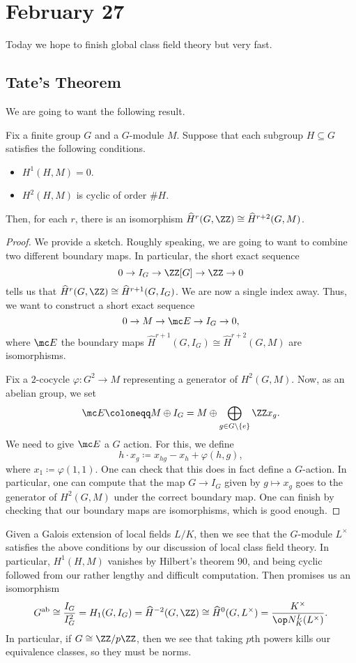 \documentclass[../notes.tex]{subfiles}
\begin{document}
\section{February 27}

Today we hope to finish global class field theory but very fast.

\subsection{Tate's Theorem}
We are going to want the following result.
\begin{theorem}[Tate] \label{thm:tate}
	Fix a finite group $G$ and a $G$-module $M$. Suppose that each subgroup $H\subseteq G$ satisfies the following conditions.
	\begin{itemize}
		\item $H^1(H,M)=0$.
		\item $H^2(H,M)$ is cyclic of order $\#H$.
	\end{itemize}
	Then, for each $r$, there is an isomorphism $\widehat H^r(G,\ZZ)\cong\widehat H^{r+2}(G,M)$.
\end{theorem}
\begin{proof}
	We provide a sketch. Roughly speaking, we are going to want to combine two different boundary maps. In particular, the short exact sequence
	\[0\to I_G\to\ZZ[G]\to\ZZ\to0\]
	tells us that $\widehat H^r(G,\ZZ)\cong\widehat H^{r+1}(G,I_G)$. We are now a single index away. Thus, we want to construct a short exact sequence
	\[0\to M\to\mc E\to I_G\to0,\]
	where $\mc E$ the boundary maps $\widehat H^{r+1}(G,I_G)\cong\widehat H^{r+2}(G,M)$ are isomorphisms.

	Fix a $2$-cocycle $\varphi\colon G^2\to M$ representing a generator of $H^2(G,M)$. Now, as an abelian group, we set
	\[\mc E\coloneqq M\oplus I_G=M\oplus\bigoplus_{g\in G\setminus\{e\}}\ZZ x_g.\]
	We need to give $\mc E$ a $G$ action. For this, we define
	\[h\cdot x_g\coloneqq x_{hg}-x_h+\varphi(h,g),\]
	where $x_1\coloneqq\varphi(1,1)$. One can check that this does in fact define a $G$-action. In particular, one can compute that the map $G\to I_G$ given by $g\mapsto x_g$ goes to the generator of $H^2(G,M)$ under the correct boundary map. One can finish by checking that our boundary maps are isomorphisms, which is good enough.
\end{proof}
\begin{example} \label{ex:artin-recip}
	Given a Galois extension of local fields $L/K$, then we see that the $G$-module $L^\times$ satisfies the above conditions by our discussion of local class field theory. In particular, $H^1(H,M)$ vanishes by Hilbert's theorem 90, and being cyclic followed from our rather lengthy and difficult computation. Then  promises us an isomorphism
	\[G^{\mathrm{ab}}\cong\frac{I_G}{I_G^2}=H_1(G,I_G)=\widehat H^{-2}(G,\ZZ)\cong\widehat H^0(G,L^\times)=\frac{K^\times}{\op N^L_K(L^\times)}.\]
	In particular, if $G\cong\ZZ/p\ZZ$, then we see that taking $p$th powers kills our equivalence classes, so they must be norms.
\end{example}
\end{document}
